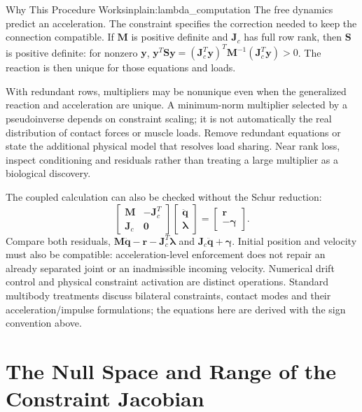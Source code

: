 \begin{laymansbox}{Why This Procedure Works}{inplain:lambda_computation}
The free dynamics predict an acceleration. The constraint specifies the correction needed to keep the connection compatible. If $\bm M$ is positive definite and $\bm J_c$ has full row rank, then $\bm S$ is positive definite: for nonzero $\bm y$, $\bm y^T\bm S\bm y=(\bm J_c^T\bm y)^T\bm M^{-1}(\bm J_c^T\bm y)>0$. The reaction is then unique for those equations and loads.

With redundant rows, multipliers may be nonunique even when the generalized reaction and acceleration are unique. A minimum-norm multiplier selected by a pseudoinverse depends on constraint scaling; it is not automatically the real distribution of contact forces or muscle loads. Remove redundant equations or state the additional physical model that resolves load sharing. Near rank loss, inspect conditioning and residuals rather than treating a large multiplier as a biological discovery.
\end{laymansbox}

The coupled calculation can also be checked without the Schur reduction:
\[
\begin{bmatrix}\bm M&-\bm J_c^T\\\bm J_c&\bm0\end{bmatrix}
\begin{bmatrix}\ddot{\bm q}\\\bm\lambda\end{bmatrix}
=\begin{bmatrix}\bm r\\-\bm\gamma\end{bmatrix}.
\]
Compare both residuals, $\bm M\ddot{\bm q}-\bm r-\bm J_c^T\bm\lambda$ and $\bm J_c\ddot{\bm q}+\bm\gamma$. Initial position and velocity must also be compatible: acceleration-level enforcement does not repair an already separated joint or an inadmissible incoming velocity. Numerical drift control and physical constraint activation are distinct operations. Standard multibody treatments discuss bilateral constraints, contact modes and their acceleration/impulse formulations; the equations here are derived with the sign convention above. \citep{TedrakeMultibodyEnergy}

\section{The Null Space and Range of the Constraint Jacobian}
\label{sec:jacobian_null_range}

